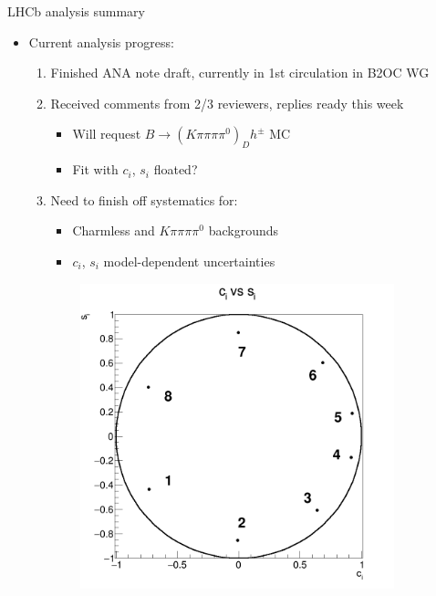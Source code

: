 \documentclass{beamer}
\begin{document}
\begin{frame}{LHCb analysis summary}
  \begin{itemize}
    \setlength\itemsep{0.5em}
    \item{Current analysis progress:}
    \begin{enumerate}
      \setlength\itemsep{0.5em}
      \item{Finished ANA note draft, currently in 1st circulation in B2OC WG}
      \item{Received comments from 2/3 reviewers, replies ready this week}
      \begin{itemize}
        \item{Will request $B\to(K\pi\pi\pi\pi^0)_Dh^\pm$ MC}
        \item{Fit with $c_i$, $s_i$ floated?}
      \end{itemize}
      \item{Need to finish off systematics for:}
      \begin{itemize}
        \item{Charmless and $K\pi\pi\pi\pi^0$ backgrounds}
        \item{$c_i$, $s_i$ model-dependent uncertainties}
      \end{itemize}
    \end{enumerate}
  \end{itemize}
  \begin{figure}
    \centering
    \vspace{-0.2cm}
    \begin{subfigure}{0.30\textwidth}
      \includegraphics[width = 1.0\textwidth]{Plots/StrongPhaseParametersPlot_cisi_8Bins.png}

\end{subfigure}
\end{figure}
\end{frame}
\end{document}
